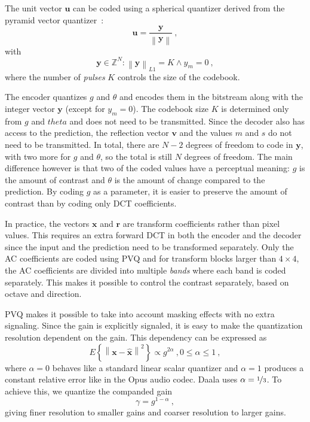 \documentclass[english,conference,10pt]{IEEEtran}
\begin{document}
The unit vector $\mathbf{u}$ can be coded using a spherical quantizer derived
from the pyramid vector quantizer~\cite{Fischer1986}:
\begin{equation}
\mathbf{u}=\frac{\mathbf{y}}{\left\|\mathbf{y}\right\|}\ ,
\end{equation}
with
\begin{equation}
\mathbf{y} \in \mathbb{Z}^N : \left\|\mathbf{y}\right\|_{L1} = K \land y_m=0\ ,
\end{equation}
where the number of \textit{pulses} $K$ controls the size of the codebook.

The encoder quantizes $g$ and $\theta$ and encodes them in the bitstream along
with the integer vector $\mathbf{y}$ (except for $y_m=0$). The codebook
size $K$ is determined only from $g$ and $theta$ and does not need to be
transmitted. Since the decoder also has access to the prediction, the
reflection vector $\mathbf{v}$ and the values $m$ and $s$ do not need to
be transmitted. In total, there are $N-2$ degrees of freedom to code in
$\mathbf{y}$, with two more for $g$ and $\theta$, so the total is still
$N$ degrees of freedom. The main difference however is that two of the
coded values have a perceptual meaning: $g$ is the amount of contrast and
$\theta$ is the amount of change compared to the prediction. By coding $g$
as a parameter, it is easier to preserve the amount of contrast than by
coding only DCT coefficients.

In practice, the vectors $\mathbf{x}$ and $\mathbf{r}$ are transform
coefficients rather than pixel values. This requires an extra forward DCT
in both the encoder and the decoder since the input and the prediction need
to be transformed separately. Only the AC coefficients are coded using PVQ
and for transform blocks larger than $4\times 4$, the AC coefficients are divided into multiple
\textit{bands} where each band is coded separately. This makes it possible
to control the contrast separately, based on octave and direction.

PVQ makes it possible to take into account masking effects with no
extra signaling. Since the gain is explicitly signaled, it is easy to make
the quantization resolution dependent on the gain. This dependency can be
expressed as
\begin{equation}
E\left\lbrace \left\| \mathbf{x} - \hat{\mathbf{x}} \right\|^2 \right\rbrace
\propto g^{2\alpha}\ , 0 \leq \alpha \leq 1\ ,
\end{equation}
where $\alpha=0$ behaves like a standard linear scalar quantizer and
$\alpha=1$ produces a constant relative error like in the Opus audio codec.
Daala uses $\alpha = \nicefrac{1}{3}$. To achieve this, we quantize the
companded gain
\begin{equation}
\gamma = g^{1-\alpha}\ ,
\end{equation}
giving finer resolution to smaller gains and coarser resolution to larger
gains.
\end{document}
